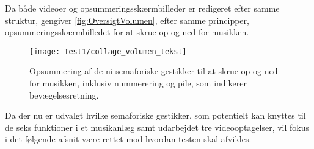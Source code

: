 \noindent
%
Da både videoer og opsummeringsskærmbilleder er redigeret efter samme struktur, gengiver \autoref{fig:OversigtVolumen}, efter samme principper, opsummeringsskærmbilledet for at skrue op og ned for musikken.  
%
\begin{figure}[H]
	\centering
	\texttt{[image: Test1/collage\_volumen\_tekst]}
	\caption{Opsummering af de ni semaforiske gestikker til at skrue op og ned for musikken, inklusiv nummerering og pile, som indikerer bevægelsesretning.}
	\label{fig:OversigtVolumen}
\end{figure}
\noindent
%
Da der nu er udvalgt hvilke semaforiske gestikker, som potentielt kan knyttes til de seks funktioner i et musikanlæg samt udarbejdet tre videooptagelser, vil fokus i det følgende afsnit være rettet mod hvordan testen skal afvikles. 
